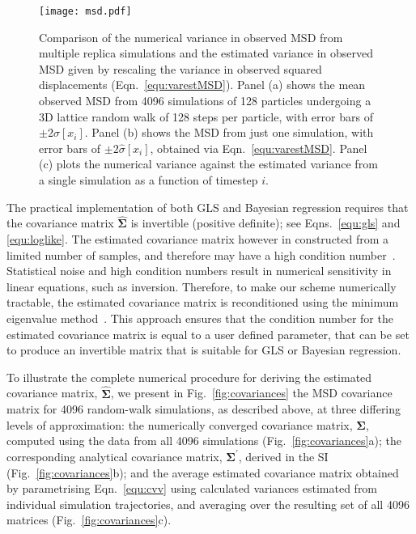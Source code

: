 \documentclass[reprint,superscriptaddress,nobibnotes,amsmath,amssymb,aps,prx,hidelinks,linenumbers]{revtex4-2}
\newcommand{\oMSDi}{\ensuremath{x_i}}
\begin{document}
\begin{figure}
    \centering
    \texttt{[image: msd.pdf]}
    \caption{
        Comparison of the numerical variance in observed MSD from multiple replica simulations and the estimated variance in observed MSD given by rescaling the variance in observed squared displacements (Eqn.~\ref{equ:varestMSD}).
        Panel (a) shows the mean observed MSD from \num{4096} simulations of \num{128} particles undergoing a 3D lattice random walk of \num{128} steps per particle, with error bars of $\pm2\sigma[\oMSDi]$.
        Panel (b) shows the MSD from just one simulation, with error bars of $\pm2\widehat{\sigma}[\oMSDi]$, obtained via Eqn.~\ref{equ:varestMSD}.
        Panel (c) plots the numerical variance against the estimated variance from a single simulation as a function of timestep $i$.
    }
    \label{fig:msd}
\end{figure}

The practical implementation of both GLS and Bayesian regression requires that the covariance matrix $\widehat{\mathbf{\Sigma}}$ is invertible (positive definite); see Eqns.~\ref{equ:gls} and \ref{equ:loglike}.
The estimated covariance matrix however in constructed from a limited number of samples, and therefore may have a high condition number~\cite{higham_restoring_2016}. 
Statistical noise and high condition numbers result in numerical sensitivity in linear equations, such as inversion. 
Therefore, to make our scheme numerically tractable, the estimated covariance matrix is reconditioned using the minimum eigenvalue method~\cite{tabeart_improving_2020}. 
This approach ensures that the condition number for the estimated covariance matrix is equal to a user defined parameter, that can be set to produce an invertible matrix that is suitable for GLS or Bayesian regression.

To illustrate the complete numerical procedure for deriving the estimated covariance matrix, $\widehat{\mathbf{\Sigma}}$, we present in Fig.~\ref{fig:covariances} the MSD covariance matrix for \num{4096} random-walk simulations, as described above, at three differing levels of approximation:
the numerically converged covariance matrix, $\bm{\Sigma}$, computed using the data from all \num{4096} simulations (Fig.~\ref{fig:covariances}a);
the corresponding analytical covariance matrix, $\mathbf{\Sigma^\prime}$, derived in the SI (Fig.~\ref{fig:covariances}b); and the average estimated covariance matrix obtained by parametrising Eqn.~\ref{equ:cvv} using calculated variances estimated from individual simulation trajectories, and averaging over the resulting set of all \num{4096} matrices (Fig.~\ref{fig:covariances}c).
\end{document}
